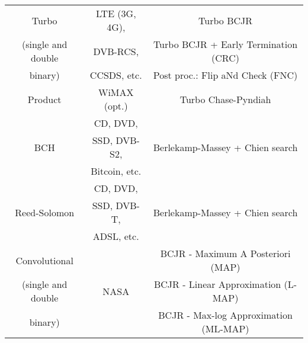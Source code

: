 \begin{table}[htp]
\begin{tabular}{ c | c | c }
  \hline
  \multirow{1}{*}{{Turbo}}                & LTE (3G, 4G),                      & Turbo BCJR                                \\
  (single and double                      & DVB-RCS,                           & Turbo BCJR + Early Termination (CRC)      \\
  binary)                                 & CCSDS, etc.                        & Post proc.: Flip aNd Check (FNC)          \\
  \hline
  \multirow{2}{*}{{Product}}              & \multirow{2}{*}{WiMAX (opt.)}      & \multirow{2}{*}{Turbo Chase-Pyndiah}      \\
                                          &                                    &                                           \\
  \hline
  \multirow{3}{*}{{BCH}}                  & CD, DVD,                           &                                           \\
                                          & SSD, DVB-S2,                       & Berlekamp-Massey + Chien search           \\
                                          & Bitcoin, etc.                      &                                           \\
  \hline
  \multirow{3}{*}{{Reed-Solomon}}         & CD, DVD,                           &                                           \\
                                          & SSD, DVB-T,                        & Berlekamp-Massey + Chien search           \\
                                          & ADSL, etc.                         &                                           \\
  \hline
  \multirow{1}{*}{{Convolutional}}        &                                    & BCJR - Maximum A Posteriori (MAP)         \\
  (single and double                      & NASA                               & BCJR - Linear Approximation (L-MAP)       \\
  binary)                                 &                                    & BCJR - Max-log Approximation (ML-MAP)     \\
  \end{tabular}
\end{table}

